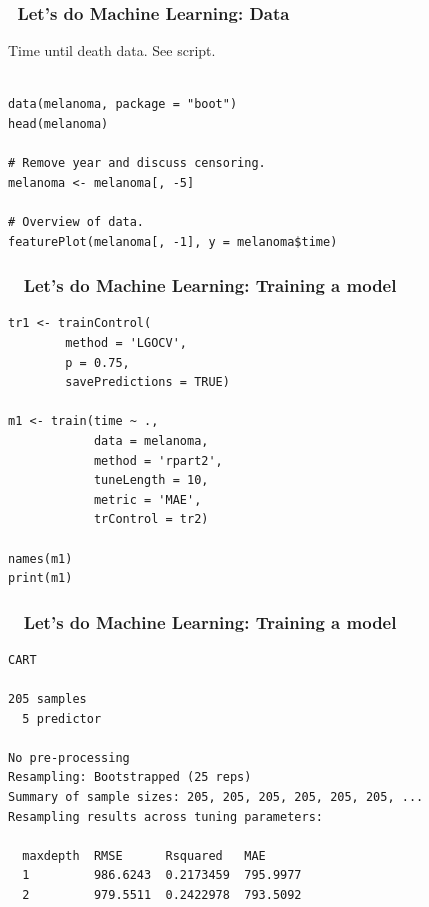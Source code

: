 \documentclass[handout, aspectratio = 169]{beamer}
\begin{document}
\begin{frame}[fragile]
\frametitle{\insertframenumber~Let's do Machine Learning: Data}
Time until death data. See script.
\begin{Verbatim}

data(melanoma, package = "boot")
head(melanoma)

# Remove year and discuss censoring.
melanoma <- melanoma[, -5]

# Overview of data.
featurePlot(melanoma[, -1], y = melanoma$time)

\end{Verbatim}

\end{frame} 



\begin{frame}[fragile]
\frametitle{\insertframenumber~ Let's do Machine Learning: Training a model}
\begin{Verbatim}
tr1 <- trainControl(
        method = 'LGOCV',
        p = 0.75,
        savePredictions = TRUE)

m1 <- train(time ~ ., 
            data = melanoma,
            method = 'rpart2',
            tuneLength = 10,
            metric = 'MAE',
            trControl = tr2)
            
names(m1)
print(m1)

\end{Verbatim}

\end{frame} 








\begin{frame}[fragile]
\frametitle{\insertframenumber~ Let's do Machine Learning: Training a model}
\begin{Verbatim}
CART 

205 samples
  5 predictor

No pre-processing
Resampling: Bootstrapped (25 reps) 
Summary of sample sizes: 205, 205, 205, 205, 205, 205, ... 
Resampling results across tuning parameters:

  maxdepth  RMSE      Rsquared   MAE     
  1         986.6243  0.2173459  795.9977
  2         979.5511  0.2422978  793.5092

\end{Verbatim}

\end{frame} 
\end{document}
